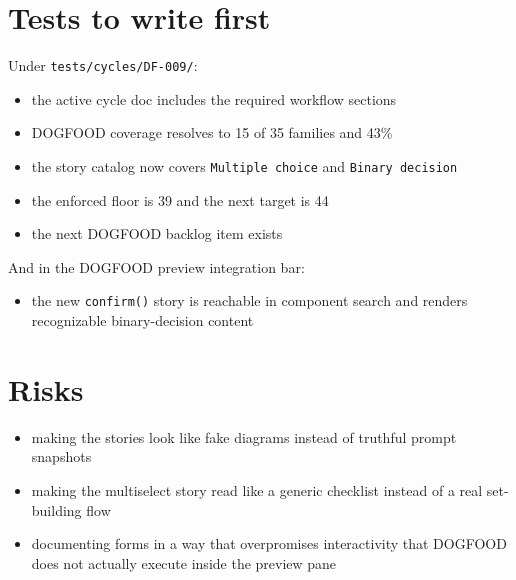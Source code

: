 \section{Tests to write first}\label{record-071-tests-to-write-first}

Under \texttt{t\allowbreak{}e\allowbreak{}s\allowbreak{}t\allowbreak{}s\allowbreak{}/\allowbreak{}c\allowbreak{}y\allowbreak{}c\allowbreak{}l\allowbreak{}e\allowbreak{}s\allowbreak{}/\allowbreak{}D\allowbreak{}F\allowbreak{}-\allowbreak{}0\allowbreak{}0\allowbreak{}9\allowbreak{}/}:

\begin{itemize}
\tightlist
\item
  the active cycle doc includes the required workflow sections
\item
  DOGFOOD coverage resolves to 15 of 35 families and 43\%
\item
  the story catalog now covers \texttt{M\allowbreak{}u\allowbreak{}l\allowbreak{}t\allowbreak{}i\allowbreak{}p\allowbreak{}l\allowbreak{}e\allowbreak{} \allowbreak{}c\allowbreak{}h\allowbreak{}o\allowbreak{}i\allowbreak{}c\allowbreak{}e} and \texttt{B\allowbreak{}i\allowbreak{}n\allowbreak{}a\allowbreak{}r\allowbreak{}y\allowbreak{} \allowbreak{}d\allowbreak{}e\allowbreak{}c\allowbreak{}i\allowbreak{}s\allowbreak{}i\allowbreak{}o\allowbreak{}n}
\item
  the enforced floor is 39 and the next target is 44
\item
  the next DOGFOOD backlog item exists
\end{itemize}

And in the DOGFOOD preview integration bar:

\begin{itemize}
\tightlist
\item
  the new \texttt{c\allowbreak{}o\allowbreak{}n\allowbreak{}f\allowbreak{}i\allowbreak{}r\allowbreak{}m\allowbreak{}(\allowbreak{})} story is reachable in component search and renders recognizable binary-decision content
\end{itemize}

\section{Risks}\label{record-071-risks}

\begin{itemize}
\tightlist
\item
  making the stories look like fake diagrams instead of truthful prompt snapshots
\item
  making the multiselect story read like a generic checklist instead of a real set-building flow
\item
  documenting forms in a way that overpromises interactivity that DOGFOOD does not actually execute inside the preview pane
\end{itemize}

